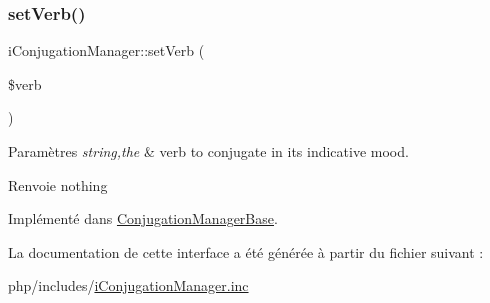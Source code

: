 \subsubsection{\texorpdfstring{set\+Verb()}{setVerb()}}
{\footnotesize\ttfamily i\+Conjugation\+Manager\+::set\+Verb (\begin{DoxyParamCaption}\item[{}]{\$verb }\end{DoxyParamCaption})}


\begin{DoxyParams}{Paramètres}
{\em string,the} & verb to conjugate in its indicative mood. \\
\hline
\end{DoxyParams}
\begin{DoxyReturn}{Renvoie}
nothing 
\end{DoxyReturn}


Implémenté dans \hyperlink{classConjugationManagerBase_a36a53a9f0bc2114a5429bcf9e3cd351e}{Conjugation\+Manager\+Base}.



La documentation de cette interface a été générée à partir du fichier suivant \+:\begin{DoxyCompactItemize}
\item 
php/includes/\hyperlink{iConjugationManager_8inc}{i\+Conjugation\+Manager.\+inc}\end{DoxyCompactItemize}
